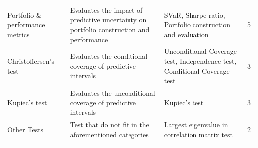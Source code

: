 \begin{table}[H]
\begin{adjustbox}{width=0.5\textwidth,center}
\begin{tabular}{p{}p{}p{}p{}}
        \addlinespace
        \hdashline[0.2pt/3pt]
        \addlinespace
        Portfolio \& performance metrics & Evaluates the impact of predictive uncertainty on portfolio construction and performance & SVaR, Sharpe ratio, Portfolio construction and evaluation & 5 \\
        \addlinespace
        \hdashline[0.2pt/3pt]
        \addlinespace
        Christoffersen's test & Evaluates the conditional coverage of predictive intervals & Unconditional Coverage test, Independence test, Conditional Coverage test & 3 \\
        \addlinespace
        \hdashline[0.2pt/3pt]
        \addlinespace
        Kupiec's test &  Evaluates the unconditional coverage of predictive intervals & Kupiec's test & 3 \\
        \addlinespace
        \hdashline[0.2pt/3pt]
        \addlinespace
        Other Tests & Test that do not fit in the aforementioned categories & Largest eigenvalue in correlation matrix test  & 2\\
        \addlinespace
        \bottomrule
    \end{tabular}
    \end{adjustbox}
\end{table}




